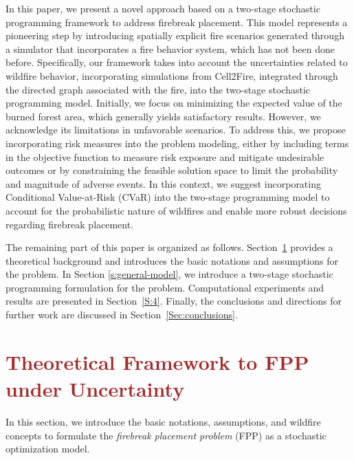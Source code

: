 \documentclass[a4paper,fleqn]{cas-sc}
\begin{document}
In this paper, we present a novel approach based on a two-stage stochastic programming framework to address firebreak placement. This model represents a pioneering step by introducing spatially explicit fire scenarios generated through a simulator that incorporates a fire behavior system, which has not been done before. Specifically, our framework takes into account the uncertainties related to wildfire behavior, incorporating simulations from Cell2Fire, integrated through the directed graph associated with the fire, into the two-stage stochastic programming model. Initially, we focus on minimizing the expected value of the burned forest area, which generally yields satisfactory results. However, we acknowledge its limitations in unfavorable scenarios. To address this, we propose incorporating risk measures into the problem modeling, either by including terms in the objective function to measure risk exposure and mitigate undesirable outcomes or by constraining the feasible solution space to limit the probability and magnitude of adverse events. In this context, we suggest incorporating Conditional Value-at-Risk (CVaR) into the two-stage programming model to account for the probabilistic nature of wildfires and enable more robust decisions regarding firebreak placement. 

The remaining part of this paper is organized as follows. Section~\ref{sec2} provides a theoretical background and introduces the basic notations and assumptions for the problem. In Section \ref{s:general-model}, we introduce a two-stage stochastic programming formulation for the problem. Computational experiments and results are presented in Section~\ref{S:4}. Finally, the conclusions and directions for further work are discussed in Section~\ref{Sec:conclusions}.

\section{\textcolor{brown}{Theoretical Framework to FPP under Uncertainty}}\label{sec2}

In this section, we introduce the basic notations, assumptions, and wildfire concepts to formulate the \textit{firebreak placement problem} (FPP) as a stochastic optimization model.
\end{document}
